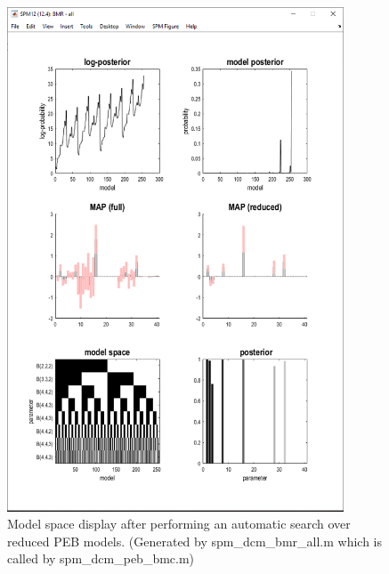 \documentclass{article}
\begin{document}
\begin{figure}[ht]
\begin{center}
\includegraphics[width=10cm]{"Fig_peb_search_part1"}
\caption{Model space display after performing an automatic search over reduced PEB models. (Generated by spm\_dcm\_bmr\_all.m which is called by spm\_dcm\_peb\_bmc.m) \label{Fig_peb_search_part1}}
\end{center}
\end{figure}
\end{document}

